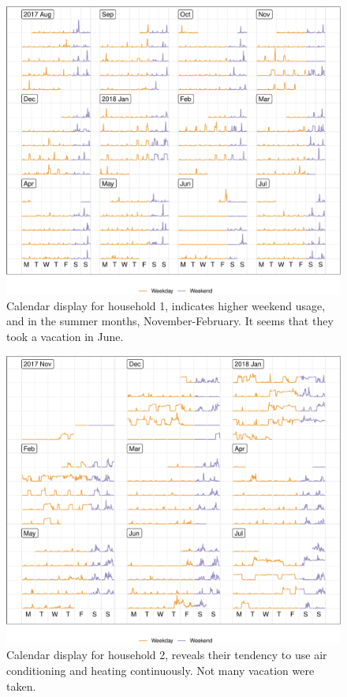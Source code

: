 \documentclass[12pt]{article}
\begin{document}
\begin{figure}

{\centering \includegraphics[width=\textwidth]{figure/h1-1} 

}

\caption{Calendar display for household 1, indicates higher weekend usage, and in the summer months, November-February. It seems that they took a vacation in June.}\label{fig:h1}
\end{figure}

\begin{figure}

{\centering \includegraphics[width=\textwidth]{figure/h2-1} 

}

\caption{Calendar display for household 2, reveals their tendency to use air conditioning and heating continuously. Not many vacation were taken.}\label{fig:h2}
\end{figure}
\end{document}
